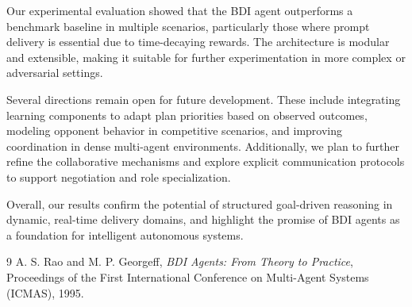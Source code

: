 \documentclass[conference]{IEEEtran}
\begin{document}
Our experimental evaluation showed that the BDI agent outperforms a benchmark baseline in multiple scenarios, particularly those where prompt delivery is essential due to time-decaying rewards. The architecture is modular and extensible, making it suitable for further experimentation in more complex or adversarial settings.

Several directions remain open for future development. These include integrating learning components to adapt plan priorities based on observed outcomes, modeling opponent behavior in competitive scenarios, and improving coordination in dense multi-agent environments. Additionally, we plan to further refine the collaborative mechanisms and explore explicit communication protocols to support negotiation and role specialization.

Overall, our results confirm the potential of structured goal-driven reasoning in dynamic, real-time delivery domains, and highlight the promise of BDI agents as a foundation for intelligent autonomous systems.



\begin{thebibliography}{9}
A. S. Rao and M. P. Georgeff,
\textit{BDI Agents: From Theory to Practice},
Proceedings of the First International Conference on Multi-Agent Systems (ICMAS), 1995.


\end{thebibliography}
\end{document}
